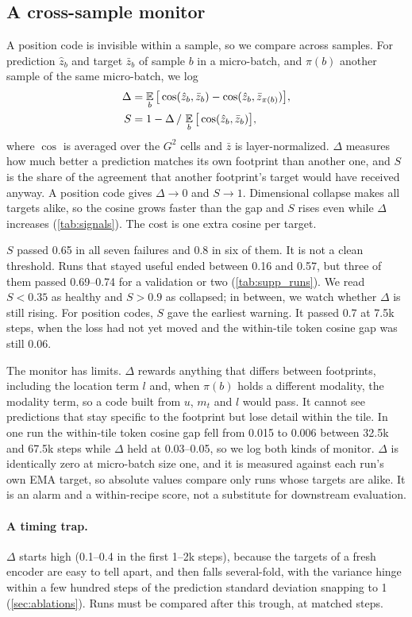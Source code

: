 \subsection{A cross-sample monitor}
\label{sec:monitor}

A position code is invisible within a sample, so we compare across samples. For prediction $\hat z_b$ and target $\bar z_b$ of sample $b$ in a micro-batch, and $\pi(b)$ another sample of the same micro-batch, we log
\begin{align}
  \Delta &= \operatorname*{\mathbb{E}}_b\big[\cos(\hat z_b, \bar z_b) - \cos(\hat z_b, \bar z_{\pi(b)})\big], \label{eq:gap}\\
  S &= 1 - \Delta \,/\, \operatorname*{\mathbb{E}}_b\big[\cos(\hat z_b, \bar z_b)\big], \label{eq:share}
\end{align}
where $\cos$ is averaged over the $G^2$ cells and $\bar z$ is layer-normalized. $\Delta$ measures how much better a prediction matches its own footprint than another one, and $S$ is the share of the agreement that another footprint's target would have received anyway. A position code gives $\Delta\to0$ and $S\to1$. Dimensional collapse makes all targets alike, so the cosine grows faster than the gap and $S$ rises even while $\Delta$ increases (\cref{tab:signals}). The cost is one extra cosine per target.

$S$ passed 0.65 in all seven failures and 0.8 in six of them. It is not a clean threshold. Runs that stayed useful ended between 0.16 and 0.57, but three of them passed 0.69--0.74 for a validation or two (\cref{tab:supp_runs}). We read $S{<}0.35$ as healthy and $S{>}0.9$ as collapsed; in between, we watch whether $\Delta$ is still rising. For position codes, $S$ gave the earliest warning. It passed 0.7 at 7.5k steps, when the loss had not yet moved and the within-tile token cosine gap was still 0.06.

The monitor has limits. $\Delta$ rewards anything that differs between footprints, including the location term $l$ and, when $\pi(b)$ holds a different modality, the modality term, so a code built from $u$, $m_t$ and $l$ would pass. It cannot see predictions that stay specific to the footprint but lose detail within the tile. In one run the within-tile token cosine gap fell from 0.015 to 0.006 between 32.5k and 67.5k steps while $\Delta$ held at 0.03--0.05, so we log both kinds of monitor. $\Delta$ is identically zero at micro-batch size one, and it is measured against each run's own EMA target, so absolute values compare only runs whose targets are alike. It is an alarm and a within-recipe score, not a substitute for downstream evaluation.

\paragraph{A timing trap.} $\Delta$ starts high (0.1--0.4 in the first 1--2k steps), because the targets of a fresh encoder are easy to tell apart, and then falls several-fold, with the variance hinge within a few hundred steps of the prediction standard deviation snapping to 1 (\cref{sec:ablations}). Runs must be compared after this trough, at matched steps.
